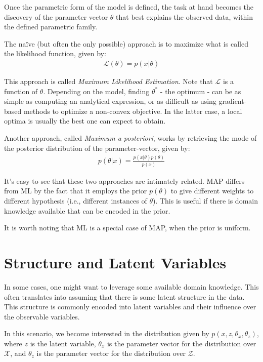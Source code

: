 Once the parametric form of the model is defined, the task at hand becomes the
discovery of the parameter vector $\theta$ that best explains the observed
data, within the defined parametric family.

The naïve (but often the only possible) approach is to maximize what is called
the likelihood function, given by:
\begin{align}
    \mathcal{L}(\theta) = p(x | \theta)
\end{align}

This approach is called \emph{Maximum Likelihood Estimation}. Note that $\mathcal{L}$
is a function of $\theta$. Depending on the model, finding $\theta^*$ - the optimum -
can be as simple as computing an analytical expression, or as difficult as using
gradient-based methods to optimize a non-convex objective. In the latter case, a
local optima is usually the best one can expect to obtain.

Another approach, called \emph{Maximum a posteriori}, works by retrieving the
mode of the posterior distribution of the parameter-vector, given by:
\begin{align}
    p(\theta | x) = \frac{p(x | \theta)p(\theta)}{p(x)}
\end{align}

It's easy to see that these two approaches are intimately related. MAP differs
from ML by the fact that it employs the prior $p(\theta)$ to give different
weights to different hypothesis (i.e., different instances of $\theta$). This
is useful if there is domain knowledge available that can be encoded in the
prior.

It is worth noting that ML is a special case of MAP, when the prior is uniform.

\section{Structure and Latent Variables}
\label{section:probmodellatvar}
In some cases, one might want to leverage some available domain knowledge. This
often translates into assuming that there is some latent structure in the data.
This structure is commonly encoded into latent variables and their influence over
the observable variables.

In this scenario, we become interested in the distribution given by
$p(x, z, \theta_x, \theta_z)$, where $z$ is the latent variable, $\theta_x$ is
the parameter vector for the distribution over $\mathcal{X}$, and $\theta_z$ is
the parameter vector for the distribution over $\mathcal{Z}$.

